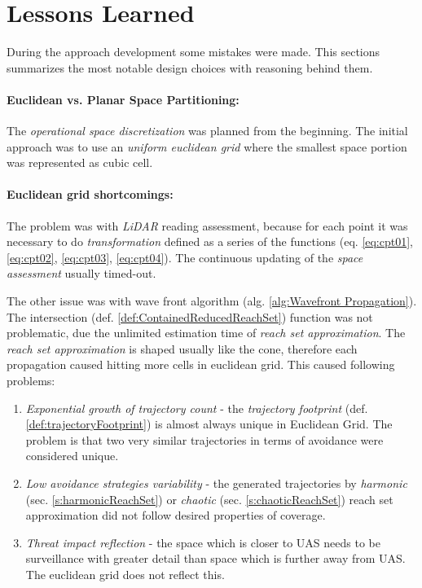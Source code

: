 \section{Lessons Learned}\label{s:lessonsLearned}
\noindent During the approach development some mistakes were made. This sections summarizes the most notable design choices with reasoning behind them.

\paragraph{Euclidean vs. Planar Space Partitioning:} The \emph{operational space discretization} was planned from the beginning. The initial approach was to use an \emph{uniform euclidean grid} where the smallest space portion was represented as cubic cell.

\paragraph{Euclidean grid shortcomings:} The problem was with \emph{LiDAR} reading assessment, because for each point it was necessary to do \emph{transformation} defined as  a series of the functions (eq. \ref{eq:cpt01}, \ref{eq:cpt02}, \ref{eq:cpt03}, \ref{eq:cpt04}). The continuous updating of the \emph{space assessment} usually timed-out. 

The other issue was with wave front algorithm (alg. \ref{alg:Wavefront Propagation}). The intersection (def. \ref{def:ContainedReducedReachSet}) function was not problematic, due the unlimited estimation time of \emph{reach set approximation}. The \emph{reach set approximation} is shaped usually like the cone, therefore each propagation caused hitting more cells in euclidean grid. This caused following problems:
\begin{enumerate}
    \item \emph{Exponential growth of trajectory count} - the \emph{trajectory footprint} (def. \ref{def:trajectoryFootprint}) is almost always unique in Euclidean Grid. The problem is that two very similar trajectories in terms of avoidance were considered unique.
    
    \item \emph{Low avoidance strategies variability} - the generated trajectories by \emph{harmonic} (sec. \ref{s:harmonicReachSet}) or \emph{chaotic} (sec. \ref{s:chaoticReachSet}) reach set approximation did not follow desired properties of coverage.
    
    \item \emph{Threat impact reflection} - the space which is closer to UAS needs to be surveillance with greater detail than space which is further away from UAS. The euclidean grid does not reflect this.
\end{enumerate}

